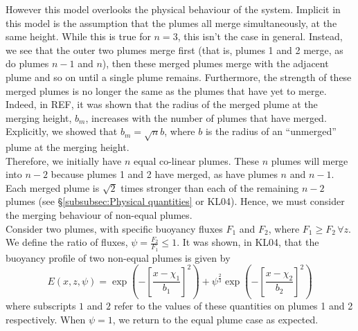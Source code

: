 \documentclass{jfm}
\begin{document}
	\noindent However this model overlooks the physical behaviour of the system. Implicit in this model is the assumption that the plumes all merge simultaneously, at the same height. While this is true for $n = 3$, this isn't the case in general. Instead, we see that the outer two plumes merge first (that is, plumes 1 and 2 merge, as do plumes $n-1$ and $n$), then these merged plumes merge with the adjacent plume and so on until a single plume remains. Furthermore, the strength of these merged plumes is no longer the same as the plumes that have yet to merge. Indeed, in REF, it was shown that the radius of the merged plume at the merging height, $b_m$, increases with the number of plumes that have merged. Explicitly, we showed that $b_m = \sqrt{n}b$, where $b$ is the radius of an ``unmerged'' plume at the merging height. \\
	
	\noindent Therefore, we initially have $n$ equal co-linear plumes. These $n$ plumes will merge into $n-2$ because plumes 1 and 2 have merged, as have plumes $n$ and $n-1$. Each merged plume is $\sqrt{2}$ times stronger than each of the remaining $n-2$ plumes (see \S \ref{subsubsec:Physical quantities} or KL04). Hence, we must consider the merging behaviour of non-equal plumes. \\
	
	\noindent Consider two plumes, with specific buoyancy fluxes $F_1$ and $F_2$, where $F_1\geq F_2 \, \forall z$. We define the ratio of fluxes, $\psi = \frac{F_2}{F_1} \leq 1$. It was shown, in KL04, that the buoyancy profile of two non-equal plumes is given by
	\begin{equation}
		E(x,z,\psi) = \exp\left(-\left[\frac{x-\chi_1}{b_1}\right]^2\right) + \psi^{\frac{2}{3}}\exp\left(-\left[\frac{x-\chi_2}{b_2}\right]^2\right)\label{eqn:two non-equal plumes buoyancy profile}
	\end{equation}
	where subscripts $1$ and $2$ refer to the values of these quantities on plumes 1 and 2 respectively. When $\psi = 1$, we return to the equal plume case as expected. \\
	
\end{document}
